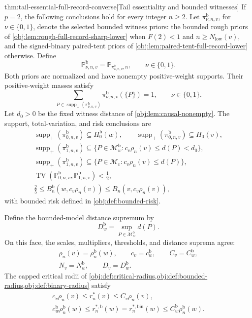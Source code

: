 \documentclass[11pt]{article}
\begin{document}
\begin{theoremv}{thm:tail-essential-full-record-converse}[Tail essentiality and bounded witnesses]
If \(p=2\), the following conclusions hold for every integer \(n\ge2\).
Let \(\pi^{\mathrm b}_{\nu,n,v}\), for \(\nu\in\{0,1\}\), denote the selected bounded witness priors: the bounded rough priors of
\cref{obj:lem:rough-full-record-sharp-lower} when
\(F(2)<1\) and \(n\ge N_{\mathrm{low}}(v)\), and the signed-binary paired-tent priors of
\cref{obj:lem:paired-tent-full-record-lower} otherwise. Define
\[
\mathbb P^{\mathrm b}_{\nu,n,v}
=\mathbb P_{\pi^{\mathrm b}_{\nu,n,v},n},
\qquad \nu\in\{0,1\}.
\]
Both priors are normalized and have nonempty positive-weight supports. Their positive-weight masses satisfy
\[
\sum_{P\in\operatorname{supp}_+(\pi^{\mathrm b}_{\nu,n,v})}
\pi^{\mathrm b}_{\nu,n,v}(\{P\})=1,
\qquad \nu\in\{0,1\}.
\]
Let \(d_0>0\) be the fixed witness distance of
\cref{obj:lem:causal-nonempty}. The support, total-variation, and risk conclusions are
\[
\begin{gathered}
\operatorname{supp}_+(\pi^{\mathrm b}_{0,n,v})
\subseteq H_0^{\mathrm b}(w),
\qquad
\operatorname{supp}_+(\pi^{\mathrm b}_{0,n,v})
\subseteq H_0(v),\\
\operatorname{supp}_+(\pi^{\mathrm b}_{1,n,v})
\subseteq
\{P\in\mathcal M^{\mathrm b}_w:c_v\rho_n(v)\le d(P)<d_0\},\\
\operatorname{supp}_+(\pi^{\mathrm b}_{1,n,v})
\subseteq
\{P\in\mathcal M_v:c_v\rho_n(v)\le d(P)\},\\
\operatorname{TV}(\mathbb P^{\mathrm b}_{0,n,v},
                  \mathbb P^{\mathrm b}_{1,n,v})<\frac12,\\
\frac25\le B_n^{\mathrm b}(w,c_v\rho_n(v))
\le B_n(v,c_v\rho_n(v)),
\end{gathered}
\]
with bounded risk defined in \cref{obj:def:bounded-risk}.

Define the bounded-model distance supremum by
\[
D_w^{\mathrm b}=\sup_{P\in\mathcal M^{\mathrm b}_w}d(P).
\]
On this face, the scales, multipliers, thresholds, and distance suprema agree:
\[
\begin{gathered}
\rho_n(v)=\rho_n^{\mathrm b}(w),
\qquad c_v=c_w^{\mathrm b},
\qquad C_v=C_w^{\mathrm b},\\
N_v=N_w^{\mathrm b},
\qquad D_v=D_w^{\mathrm b}.
\end{gathered}
\]
The capped critical radii of
\cref{obj:def:critical-radius,obj:def:bounded-radius,obj:def:binary-radius}
satisfy
\[
\begin{gathered}
c_v\rho_n(v)\le r_n^*(v)\le C_v\rho_n(v),\\
c_w^{\mathrm b}\rho_n^{\mathrm b}(w)
\le r_n^{*,\mathrm b}(w)=r_n^{*,\mathrm{bin}}(w)
\le C_w^{\mathrm b}\rho_n^{\mathrm b}(w).
\end{gathered}
\]


\end{theoremv}
\end{document}
